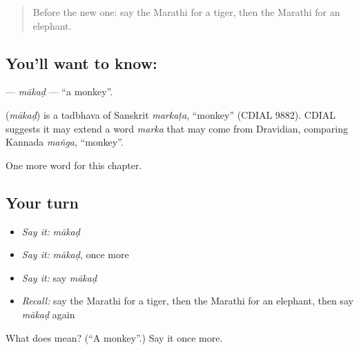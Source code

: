 \label{lesson:MR-C101-makad}



\begin{quote}
Before the new one: say the Marathi for a tiger, then the Marathi for an elephant.
\end{quote}

\subsection*{You'll want to know: }
\textbf{} — \emph{mākaḍ} — \textquotedblleft{}a monkey\textquotedblright{}.

\begin{cousinweb}
\textbf{} (\emph{mākaḍ}) is a tadbhava of Sanskrit \emph{markaṭa}, \textquotedblleft{}monkey\textquotedblright{} (CDIAL 9882). CDIAL suggests it may extend a word \emph{marka} that may come from Dravidian, comparing Kannada \emph{maṅga}, \textquotedblleft{}monkey\textquotedblright{}.
\end{cousinweb}

\begin{grammarlens}[title={What you've built}]
One more word for this chapter.
\end{grammarlens}

\subsection*{Your turn}
\begin{itemize}
\raggedright
  \item \emph{Say it:} \emph{mākaḍ}
  \item \emph{Say it:} \emph{mākaḍ}, once more
  \item \emph{Say it:} say \emph{mākaḍ}
  \item \emph{Recall:} say the Marathi for a tiger, then the Marathi for an elephant, then say \emph{mākaḍ} again
\end{itemize}

\begin{tcolorbox}[breakable,colback=teal!4,colframe=teal!35!black,title={Before you move on}]
What does  mean? (\textquotedblleft{}A monkey\textquotedblright{}.) Say it once more.
\end{tcolorbox}
